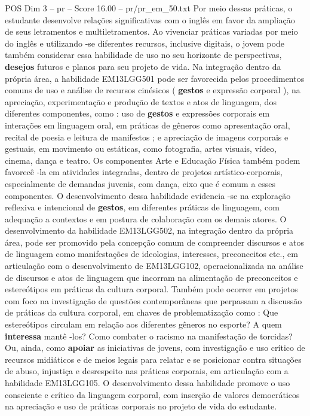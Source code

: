 \begin{textsample}{POS Dim 3 – pr – Score 16.00 – pr/pr\_em\_50.txt}
Por meio dessas práticas, o estudante desenvolve relações significativas com o inglês em favor da ampliação de seus letramentos e multiletramentos.
Ao vivenciar práticas variadas por meio do inglês e utilizando -se diferentes recursos, inclusive digitais, o jovem pode também considerar essa habilidade de uso no seu horizonte de perspectivas, \textbf{desejos} futuros e planos para seu projeto de vida.
Na integração dentro da própria área, a habilidade EM13LGG501 pode ser favorecida pelos procedimentos comuns de uso e análise de recursos cinésicos ( \textbf{gestos} e expressão corporal ), na apreciação, experimentação e produção de textos e atos de linguagem, dos diferentes componentes, como : uso de \textbf{gestos} e expressões corporais em interações em linguagem oral, em práticas de gêneros como apresentação oral, recital de poesia e leitura de manifestos ; e apreciação de imagens corporais e gestuais, em movimento ou estáticas, como fotografia, artes visuais, vídeo, cinema, dança e teatro.
Os componentes Arte e Educação Física também podem favorecê -la em atividades integradas, dentro de projetos artístico-corporais, especialmente de demandas juvenis, com dança, eixo que é comum a esses componentes.
O desenvolvimento dessa habilidade evidencia -se na exploração reflexiva e intencional de \textbf{gestos}, em diferentes práticas de linguagem, com adequação a contextos e em postura de colaboração com os demais atores.
O desenvolvimento da habilidade EM13LGG502, na integração dentro da própria área, pode ser promovido pela concepção comum de compreender discursos e atos de linguagem como manifestações de ideologias, interesses, preconceitos etc., em articulação com o desenvolvimento de EM13LGG102, operacionalizada na análise de discursos e atos de linguagem que incorram na alimentação de preconceitos e estereótipos em práticas da cultura corporal.
Também pode ocorrer em projetos com foco na investigação de questões contemporâneas que perpassam a discussão de práticas da cultura corporal, em chaves de problematização como : Que estereótipos circulam em relação aos diferentes gêneros no esporte?
A quem \textbf{interessa} mantê -los?
Como combater o racismo na manifestação de torcidas?
Ou, ainda, como \textbf{apoiar} as iniciativas de jovens, com investigação e uso crítico de recursos midiáticos e de meios legais para relatar e se posicionar contra situações de abuso, injustiça e desrespeito nas práticas corporais, em articulação com a habilidade EM13LGG105.
O desenvolvimento dessa habilidade promove o uso consciente e crítico da linguagem corporal, com inserção de valores democráticos na apreciação e uso de práticas corporais no projeto de vida do estudante.

\end{textsample}

